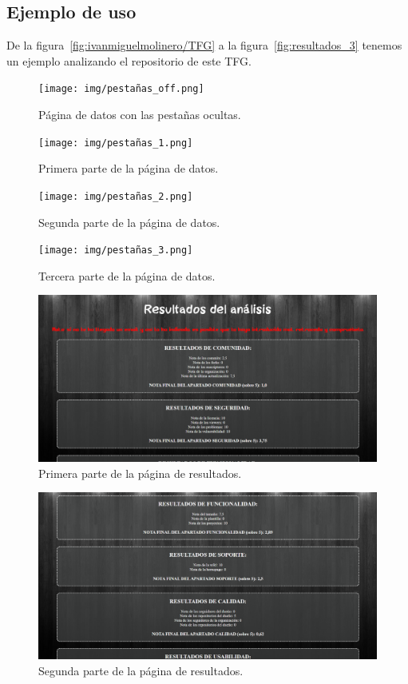 \documentclass[a4paper, 12pt]{book}
\begin{document}
\subsection{Ejemplo de uso}
De la figura~\ref{fig:ivanmiguelmolinero/TFG} a la figura~\ref{fig:resultados_3} tenemos un ejemplo analizando el repositorio de este TFG.
\begin{figure}
    
    \texttt{[image: img/pestañas\_off.png]}
    \caption{Página de datos con las pestañas ocultas.}\label{fig:pestañas_off}
\end{figure}
\begin{figure}
    
    \texttt{[image: img/pestañas\_1.png]}
    \caption{Primera parte de la página de datos.}\label{fig:pestañas_1}
\end{figure}
\begin{figure}
    
    \texttt{[image: img/pestañas\_2.png]}
    \caption{Segunda parte de la página de datos.}\label{fig:pestañas_2}
\end{figure}
\begin{figure}
    
    \texttt{[image: img/pestañas\_3.png]}
    \caption{Tercera parte de la página de datos.}\label{fig:pestañas_3}
\end{figure}
\begin{figure}
    
    \includegraphics[bb=0 0 800 600, width=12cm, keepaspectratio]{img/resultados_1.png}
    \caption{Primera parte de la página de resultados.}\label{fig:resultados_1}
\end{figure}
\begin{figure}
    
    \includegraphics[bb=0 0 800 600, width=12cm, keepaspectratio]{img/resultados_2.png}
    \caption{Segunda parte de la página de resultados.}\label{fig:resultados_2}
\end{figure}
\end{document}
